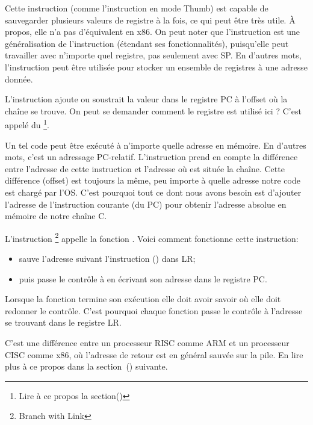 Cette instruction (comme l'instruction \PUSH en mode Thumb) est capable de
sauvegarder plusieurs valeurs de registre à la fois, ce qui peut être très utile.
À propos, elle n'a pas d'équivalent en x86.
On peut noter que l'instruction  est une généralisation de l'instruction
\PUSH (étendant ses fonctionnalités), puisqu'elle peut travailler avec n'importe
quel registre, pas seulement avec \ac{SP}.
En d'autres mots, l'instruction  peut être utilisée pour stocker un
ensemble de registres à une adresse donnée.

\myindex{\PICcode}
L'instruction 
ajoute ou soustrait la valeur dans le registre \ac{PC} à l'offset où la chaîne
 se trouve.
On peut se demander comment le registre  est utilisé ici ?
C'est appelé du \q{\PICcode}\footnote{Lire à ce propos la section()}.

Un tel code peut être exécuté à n'importe quelle adresse en mémoire.
En d'autres mots, c'est un adressage \ac{PC}-relatif. %
L'instruction  prend en compte la différence entre l'adresse de cette
instruction et l'adresse où est située la chaîne.
Cette différence (offset) est toujours la même, peu importe à quelle adresse
notre code est chargé par l'\ac{OS}.
C'est pourquoi tout ce dont nous avons besoin est d'ajouter l'adresse de l'instruction
courante (du \ac{PC}) pour obtenir l'adresse absolue en mémoire de notre chaîne C.

L'instruction \footnote{Branch with Link} appelle la fonction \printf.
Voici comment fonctionne cette instruction:

\begin{itemize}
\item sauve l'adresse suivant l'instruction  () dans \ac{LR};
\item puis passe le contrôle à \printf en écrivant son adresse dans le registre \ac{PC}.
\end{itemize}

Lorsque la fonction \printf termine son exécution elle doit avoir savoir où elle
doit redonner le contrôle.
C'est pourquoi chaque fonction passe le contrôle à l'adresse se trouvant dans le registre \ac{LR}.

C'est une différence entre un processeur \ac{RISC}  comme ARM et un
processeur \ac{CISC} comme x86, où l'adresse de retour est en général sauvée
sur la pile.
En lire plus à ce propos dans la section~() suivante.

